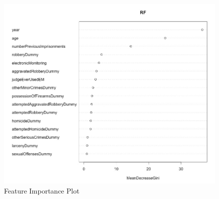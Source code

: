 \documentclass[a4paper,12pt]{article}
\begin{document}
\begin{figure}[h]
\centering
\includegraphics[scale=0.50]{feature_imp.jpg}
\caption{Feature Importance Plot}
\label{fig:Figure 1}
\end{figure}
\end{document}
